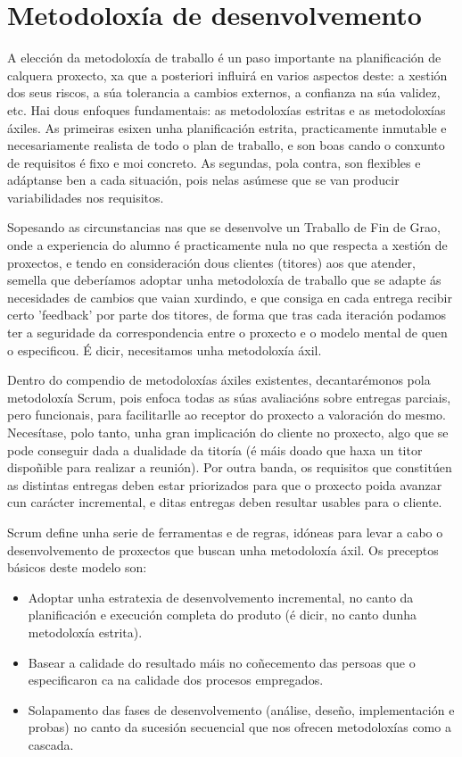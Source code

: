 \section{Metodoloxía de desenvolvemento}

A elección da metodoloxía de traballo é un paso importante na planificación de calquera proxecto, xa que a posteriori influirá en varios aspectos deste: a xestión dos seus riscos, a súa tolerancia a cambios externos, a confianza na súa validez, etc. Hai dous enfoques fundamentais: as metodoloxías estritas e as metodoloxías áxiles. As primeiras esixen unha planificación estrita, practicamente inmutable e necesariamente realista de todo o plan de traballo, e son boas cando o conxunto de requisitos é fixo e moi concreto. As segundas, pola contra, son flexibles e adáptanse ben a cada situación, pois nelas asúmese que se van producir variabilidades nos requisitos.

Sopesando as circunstancias nas que se desenvolve un Traballo de Fin de Grao, onde a experiencia do alumno é practicamente nula no que respecta a xestión de proxectos, e tendo en consideración dous clientes (titores) aos que atender, semella que deberíamos adoptar unha metodoloxía de traballo que se adapte ás necesidades de cambios que vaian xurdindo, e que consiga en cada entrega recibir certo 'feedback' por parte dos titores, de forma que tras cada iteración podamos ter a seguridade da correspondencia entre o proxecto e o modelo mental de quen o especificou. É dicir, necesitamos unha metodoloxía áxil.

Dentro do compendio de metodoloxías áxiles existentes, decantarémonos pola metodoloxía Scrum\cite{scrum}, pois enfoca todas as súas avaliacións sobre entregas parciais, pero funcionais, para facilitarlle ao receptor do proxecto a valoración do mesmo. Necesítase, polo tanto, unha gran implicación do cliente no proxecto, algo que se pode conseguir dada a dualidade da titoría (é máis doado que haxa un titor dispoñible para realizar a reunión). Por outra banda, os requisitos que constitúen as distintas entregas deben estar priorizados para que o proxecto poida avanzar cun carácter incremental, e ditas entregas deben resultar usables para o cliente.

Scrum define unha serie de ferramentas e de regras, idóneas para levar a cabo o desenvolvemento de proxectos que buscan unha metodoloxía áxil. Os preceptos básicos deste modelo son:

\begin{itemize}
\item Adoptar unha estratexia de desenvolvemento incremental, no canto da planificación e execución completa do produto (é dicir, no canto dunha metodoloxía estrita).
\item Basear a calidade do resultado máis no coñecemento das persoas que o especificaron ca na calidade dos procesos empregados.
\item Solapamento das fases de desenvolvemento (análise, deseño, implementación e probas) no canto da sucesión secuencial que nos ofrecen metodoloxías como a cascada.
\end{itemize} 

